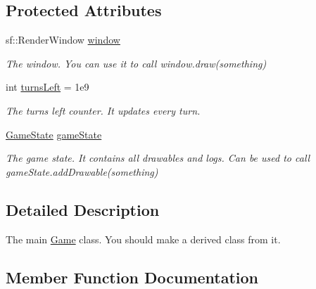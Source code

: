 \subsection*{Protected Attributes}
\begin{DoxyCompactItemize}
\item 
sf\+::\+Render\+Window \hyperlink{classGame_a223de215aeb661cd423ac145756cc730}{window}\hypertarget{classGame_a223de215aeb661cd423ac145756cc730}{}\label{classGame_a223de215aeb661cd423ac145756cc730}

\begin{DoxyCompactList}\small\item\em The window. You can use it to call window.\+draw(something) \end{DoxyCompactList}\item 
int \hyperlink{classGame_a116a07a6c0209b4ea22c465892b37ac6}{turns\+Left} = 1e9\hypertarget{classGame_a116a07a6c0209b4ea22c465892b37ac6}{}\label{classGame_a116a07a6c0209b4ea22c465892b37ac6}

\begin{DoxyCompactList}\small\item\em The turns left counter. It updates every turn. \end{DoxyCompactList}\item 
\hyperlink{classGameState}{Game\+State} \hyperlink{classGame_a4573dd85e0711a78cc27eb0b51c79f44}{game\+State}\hypertarget{classGame_a4573dd85e0711a78cc27eb0b51c79f44}{}\label{classGame_a4573dd85e0711a78cc27eb0b51c79f44}

\begin{DoxyCompactList}\small\item\em The game state. It contains all drawables and logs. Can be used to call game\+State.\+add\+Drawable(something) \end{DoxyCompactList}\end{DoxyCompactItemize}


\subsection{Detailed Description}
The main \hyperlink{classGame}{Game} class. You should make a derived class from it. 

\subsection{Member Function Documentation}
